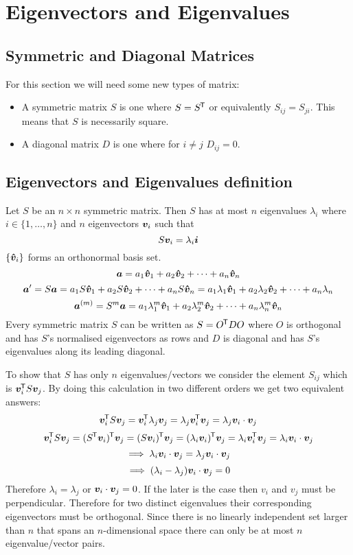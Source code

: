 \documentclass{article}
\begin{document}
    \section{Eigenvectors and Eigenvalues}
    \subsection{Symmetric and Diagonal Matrices}
    For this section we will need some new types of matrix:
    \begin{itemize}
        \item A symmetric matrix \(S\) is one where \(S = S^{\mkern-1.5mu\mathsf{T}}\) or equivalently \(S_{ij} = S_{ji}\). This means that \(S\) is necessarily square.
        \item A diagonal matrix \(D\) is one where for \(i \ne j\) \(D_{ij} = 0\).
    \end{itemize}
    
    \subsection{Eigenvectors and Eigenvalues definition}
    Let \(S\) be an \(n\times n\) symmetric matrix. Then \(S\) has at most \(n\) eigenvalues \(\lambda_i\) where \(i\in\{1,\dotsc,n\}\) and \(n\) eigenvectors \(\bm{v}_i\) such that
    \[S\bm{v}_i = \lambda_i\bm{i}\]
    \(\{\bm{\hat{v}}_i\}\) forms an orthonormal basis set.
    \[\bm{a} = a_1\bm{\hat{v}}_1 + a_2\bm{\hat{v}}_2 + \dotsb + a_n\bm{\hat{v}}_n\]
    \[\bm{a}' = S\bm{a} =  a_1S\bm{\hat{v}}_1 + a_2S\bm{\hat{v}}_2 + \dotsb + a_nS\bm{\hat{v}}_n = a_1\lambda_1\bm{\hat{v}}_1 + a_2\lambda_2\bm{\hat{v}}_2 +\dotsb + a_n\lambda_n\]
    \[\bm{a}^{(m)} = S^m\bm{a} =  a_1\lambda_1^m\bm{\hat{v}}_1 + a_2\lambda_2^m\bm{\hat{v}}_2 +\dotsb + a_n\lambda_n^m\bm{\hat{v}}_n\]
    Every symmetric matrix \(S\) can be written as \(S = O^{\mkern-1.5mu\mathsf{T}} DO\) where \(O\) is orthogonal and has \(S\)'s normalised eigenvectors as rows and \(D\) is diagonal and has \(S\)'s eigenvalues along its leading diagonal.
    
    To show that \(S\) has only \(n\) eigenvalues/vectors we consider the element \(S_{ij}\) which is \(\bm{v}_i^{\mkern-1.5mu\mathsf{T}} S\bm{v}_j\). 
    By doing this calculation in two different orders we get two equivalent answers:
    \[\bm{v}_i^{\mkern-1.5mu\mathsf{T}} S\bm{v}_j = \bm{v}_i^{\mkern-1.5mu\mathsf{T}}\lambda_j\bm{v}_j = \lambda_j\bm{v}_i^{\mkern-1.5mu\mathsf{T}}\bm{v}_j = \lambda_j\bm{v}_i\cdot\bm{v}_j\]
    \[\bm{v}_i^{\mkern-1.5mu\mathsf{T}} S\bm{v}_j = (S^{\mkern-1.5mu\mathsf{T}}\bm{v}_i)^{\mkern-1.5mu\mathsf{T}}\bm{v}_j = (S\bm{v}_i)^{\mkern-1.5mu\mathsf{T}}\bm{v}_j = (\lambda_i\bm{v}_i)^{\mkern-1.5mu\mathsf{T}}\bm{v}_j = \lambda_i\bm{v}_i^{\mkern-1.5mu\mathsf{T}}\bm{v}_j = \lambda_i\bm{v}_i\cdot \bm{v}_j\]
    \[\implies \lambda_i\bm{v}_i\cdot \bm{v}_j = \lambda_j\bm{v}_i\cdot \bm{v}_j\]
    \[\implies (\lambda_i - \lambda_j) \bm{v}_i\cdot \bm{v}_j = 0\]
    Therefore \(\lambda_i = \lambda_j\) or \(\bm{v}_i\cdot\bm{v}_j = 0\). 
    If the later is the case then \(v_i\) and \(v_j\) must be perpendicular.
    Therefore for two distinct eigenvalues their corresponding eigenvectors must be orthogonal.
    Since there is no linearly independent set larger than \(n\) that spans an \(n\)-dimensional space there can only be at most \(n\) eigenvalue/vector pairs.
    
\end{document}
